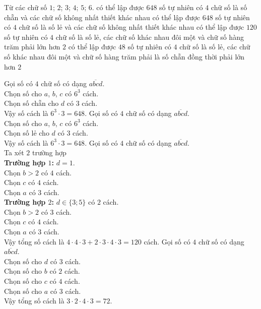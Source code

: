 \begin{ex}%
	Từ các chữ số $1$; $2$; $3$; $4$; $5$; $6$.
	\choiceTF
	{\True có thể lập được $648$ số tự nhiên có $4$ chữ số là số chẵn và các chữ số không nhất thiết khác nhau}
	{\True có thể lập được $648$ số tự nhiên có $4$ chữ số là số lẻ và các chữ số không nhất thiết khác nhau}
	{\True có thể lập được $120$ số tự nhiên có $4$ chữ số là số lẻ, các chữ số khác nhau đôi một và chữ số hàng trăm phải lớn hơn $2$}
	{có thể lập được $48$ số tự nhiên có $4$ chữ số là số lẻ, các chữ số khác nhau đôi một và chữ số hàng trăm phải là số chẵn đồng thời phải lớn hơn $2$}
	\loigiai
	{
		\begin{itemchoice}
			\itemch
			Gọi số có $4$ chữ số có dạng $\overline{abcd}$.\\
			Chọn số cho $a$, $b$, $c$ có $6^3$ cách.\\
			Chọn số chẵn cho $d$ có $3$ cách.\\
			Vậy số cách là $6^3\cdot3=648$.
			\itemch
			Gọi số có $4$ chữ số có dạng $\overline{abcd}$.\\
			Chọn số cho $a$, $b$, $c$ có $6^3$ cách.\\
			Chọn số lẻ cho $d$ có $3$ cách.\\
			Vậy số cách là $6^3\cdot3=648$.
			\itemch
			Gọi số có $4$ chữ số có dạng $\overline{abcd}$.\\
			Ta xét $2$ trường hợp \\
			\textbf{Trường hợp $1$:} $d=1$.\\
			Chọn $b>2$ có $4$ cách.\\
			Chọn $c$ có $4$ cách.\\
			Chọn $a$ có $3$ cách. \\
			\textbf{Trường hợp $2$:} $d\in \{3;5\}$ có $2$ cách.\\
			Chọn $b>2$ có $3$ cách.\\
			Chọn $c$ có $4$ cách.\\
			Chọn $a$ có $3$ cách. \\
			Vậy tổng số cách là $4\cdot 4\cdot 3+2\cdot 3\cdot 4\cdot 3=120$ cách.
			\itemch Gọi số có $4$ chữ số có dạng $\overline{abcd}$.\\
			Chọn số cho $d$ có $3$ cách.\\
			Chọn số cho $b$ có $2$ cách.\\
			Chọn số cho $c$ có $4$ cách.\\
			Chọn số cho $a$ có $3$ cách.\\
			Vậy tổng số cách là $3\cdot 2\cdot 4\cdot 3=72$.
		\end{itemchoice}
	}
\end{ex}
